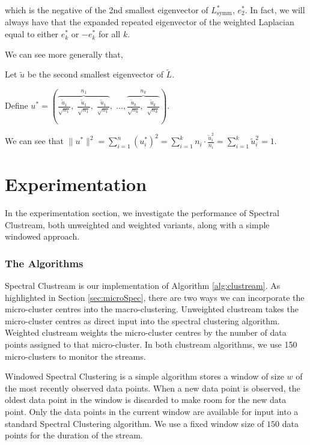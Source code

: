 which is the negative of the 2nd smallest eigenvector of $L^*_{\text{symm}}$, $e_2^*$. 
In fact, we will always have that the expanded repeated eigenvector of the weighted Laplacian equal to either $e_k^*$ or $-e_k^*$ for all $k$.

We can see more generally that, 

Let $\tilde{u}$ be the second smallest eigenvector of $\tilde{L}$.

Define $u^* =  \left( \overbrace{\frac{\tilde{u}_1}{\sqrt{n_1}}, \; \frac{\tilde{u}_1}{\sqrt{n_1}}, \; \frac{\tilde{u}_1}{\sqrt{n_1}}}^{n_1}, \; \hdots, \overbrace{\frac{\tilde{u}_k}{\sqrt{n_k}}, \; \frac{\tilde{u}_k}{\sqrt{n_k}}}^{n_k} \right)$. 

We can see that $\|u^*\|^2 = \sum_{i = 1}^{n}(u_i^*)^2 = \sum_{i=1}^{k}n_i \cdot \frac{\tilde{u}_i^2}{n_i} = \sum_{i = 1}^{k} \tilde{u}^2_i = 1$. 

\section{Experimentation}
 \label{sec:spec_clust_study}

In the experimentation section, we investigate the performance of Spectral Clustream, both unweighted and weighted variants, along with a simple windowed approach. 


\subsubsection{The Algorithms}

Spectral Clustream is our implementation of Algorithm \ref{alg:clustream}. As highlighted in Section \ref{sec:microSpec}, there are two  ways we can incorporate the micro-cluster centres into the macro-clustering. Unweighted clustream takes the micro-cluster centres as direct input into the spectral clustering algorithm. Weighted clustream weights the micro-cluster centres by the number of data points assigned to that micro-cluster. In both clustream algorithms, we use 150 micro-clusters to monitor the streams.

Windowed Spectral Clustering is a simple algorithm stores a window of size $w$ of the most recently observed data points. When a new data point is observed, the oldest data point in the window is discarded to make room for the new data point. Only the data points in the current window are available for input into a standard Spectral Clustering algorithm. We use a fixed window size of $150$ data points for the duration of the stream.

